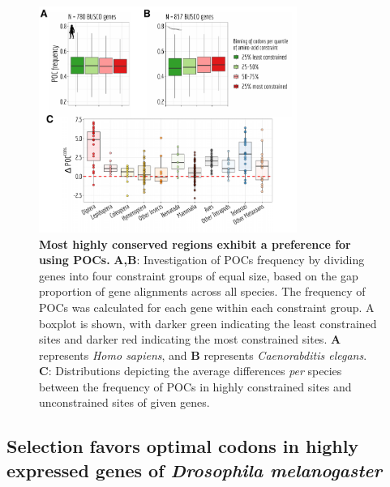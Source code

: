 \begin{figure}[t]   
    \begin{center}
        \includegraphics[width=0.75\textwidth]{Figure5.pdf}
    \end{center}                                                                       
    \caption[Most highly conserved regions exhibit a preference for using POCs]{\textbf{Most highly conserved regions exhibit a preference for using POCs.} \textbf{A,B}: Investigation of POCs frequency by dividing genes into four constraint groups of equal size, based on the gap proportion of gene alignments across all species. The frequency of POCs was calculated for each gene within each constraint group. A boxplot is shown, with darker green indicating the least constrained sites and darker red indicating the most constrained sites. \textbf{A} represents \textit{Homo sapiens}, and \textbf{B} represents \textit{Caenorabditis elegans}. \textbf{C}: Distributions depicting the average differences \textit{per} species between the frequency of POCs in highly constrained sites and unconstrained sites of given genes.}
    \label{fig:CU5}
\end{figure}


\subsection{Selection favors optimal codons in highly expressed genes of \textit{Drosophila melanogaster}}

